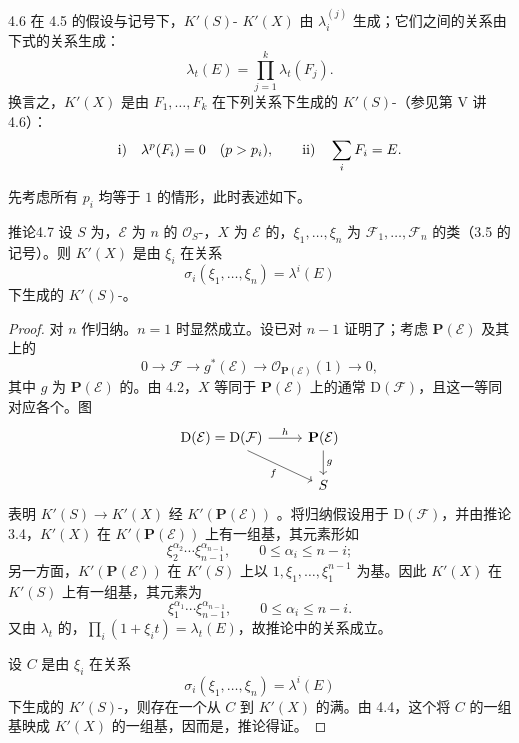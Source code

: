 \begin{SGAresult}{}{4.6}
在 4.5 的假设与记号下，$K'(S)$- $K'(X)$ 由 $\lambda_i^{(j)}$ 生成；它们之间的关系由下式的关系生成：
\[
\lambda_t(E)=\prod_{j=1}^k\lambda_t(F_j).
\]
换言之，$K'(X)$ 是由 $F_1,\ldots,F_k$ 在下列关系下生成的 $K'(S)$-（参见第 V 讲 4.6）：
\[
\textup{i)}\quad \lambda^p(F_i)=0\quad(p>p_i),\qquad
\textup{ii)}\quad \sum_i F_i=E.
\]
\end{SGAresult}

先考虑所有 $p_i$ 均等于 $1$ 的情形，此时表述如下。
\begin{SGAresult}{推论}{4.7}
设 $S$ 为，$\mathcal E$ 为 $n$ 的 $\mathcal O_S$-，$X$ 为 $\mathcal E$ 的，$\xi_1,\ldots,\xi_n$ 为 $\mathcal F_1,\ldots,\mathcal F_n$ 的类（3.5 的记号）。则 $K'(X)$ 是由 $\xi_i$ 在关系
\[
\sigma_i(\xi_1,\ldots,\xi_n)=\lambda^i(E)
\]
下生成的 $K'(S)$-。
\end{SGAresult}
\begin{proof}
对 $n$ 作归纳。$n=1$ 时显然成立。设已对 $n-1$ 证明了；考虑 $\mathbf P(\mathcal E)$ 及其上的
\[
0\longrightarrow\mathcal F\longrightarrow g^*(\mathcal E)
\longrightarrow\mathcal O_{\mathbf P(\mathcal E)}(1)\longrightarrow0,
\]
其中 $g$ 为 $\mathbf P(\mathcal E)$ 的。由 4.2，$X$ 等同于 $\mathbf P(\mathcal E)$ 上的通常 $\mathrm D(\mathcal F)$，且这一等同对应各个。图
\[
\begin{tikzcd}
\mathrm D(\mathcal E)=\mathrm D(\mathcal F)\arrow[r,"h"]\arrow[dr,"f"'] & \mathbf P(\mathcal E)\arrow[d,"g"]\\
&S
\end{tikzcd}
\]
表明 $K'(S)\longrightarrow K'(X)$ 经 $K'(\mathbf P(\mathcal E))$ 。将归纳假设用于 $\mathrm D(\mathcal F)$，并由推论 3.4，$K'(X)$ 在 $K'(\mathbf P(\mathcal E))$ 上有一组基，其元素形如
\[
\xi_2^{\alpha_2}\cdots\xi_{n-1}^{\alpha_{n-1}},\qquad 0\leq\alpha_i\leq n-i;
\]
另一方面，$K'(\mathbf P(\mathcal E))$ 在 $K'(S)$ 上以 $1,\xi_1,\ldots,\xi_1^{n-1}$ 为基。因此 $K'(X)$ 在 $K'(S)$ 上有一组基，其元素为
\[
\xi_1^{\alpha_1}\cdots\xi_{n-1}^{\alpha_{n-1}},\qquad 0\leq\alpha_i\leq n-i.
\]
又由 $\lambda_t$ 的，$\prod_i(1+\xi_it)=\lambda_t(E)$，故推论中的关系成立。

设 $C$ 是由 $\xi_i$ 在关系
\[
\sigma_i(\xi_1,\ldots,\xi_n)=\lambda^i(E)
\]
下生成的 $K'(S)$-，则存在一个从 $C$ 到 $K'(X)$ 的满。由 4.4，这个将 $C$ 的一组基映成 $K'(X)$ 的一组基，因而是，推论得证。
\end{proof}

